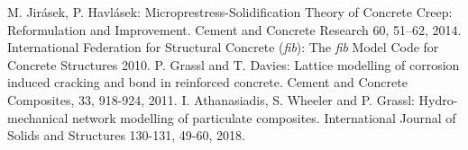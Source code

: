 \documentclass[a4paper]{article}
\begin{document}
\begin{thebibliography}{99}
 M. Jir\'{a}sek, P. Havl\'{a}sek: Microprestress-Solidification Theory of Concrete Creep: Reformulation and Improvement. Cement and Concrete Research 60, 51–62, 2014.
 International Federation for Structural Concrete (\textit{fib}): The \textit{fib} Model Code for Concrete Structures 2010.
 P. Grassl and T. Davies: Lattice modelling of corrosion induced cracking and bond in reinforced concrete. Cement and Concrete Composites, 33, 918-924, 2011.
 I. Athanasiadis, S. Wheeler and P. Grassl: Hydro-mechanical network modelling of particulate composites. International Journal of Solids and Structures 130-131, 49-60, 2018.
\end{thebibliography}
\end{document}
